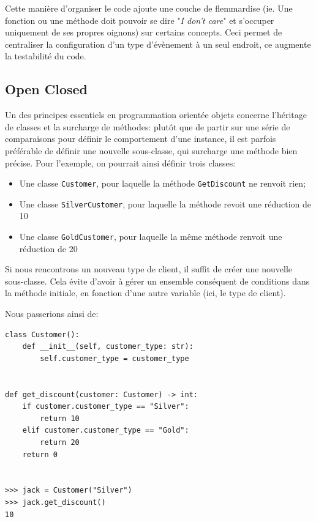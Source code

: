 \documentclass[11pt]{amsbook}
\begin{document}
Cette manière d’organiser le code ajoute une couche de flemmardise (ie. Une fonction ou une méthode doit pouvoir se dire "\emph{I don’t care}" et s’occuper uniquement de ses propres oignons) sur certains concepts. Ceci permet de centraliser la configuration d’un type d’évènement à un seul endroit, ce augmente la testabilité du code.


\hypertarget{x-open-closed}{\subsection{Open Closed}}
Un des principes essentiels en programmation orientée objets concerne l’héritage de classes et la surcharge de méthodes: plutôt que de partir sur une série de comparaisons pour définir le comportement d’une instance, il est parfois préférable de définir une nouvelle sous-classe, qui surcharge une méthode bien précise.
Pour l’exemple, on pourrait ainsi définir trois classes:


\begin{itemize}

\item Une classe \texttt{Customer}, pour laquelle la méthode \texttt{GetDiscount} ne renvoit rien;

\item Une classe \texttt{SilverCustomer}, pour laquelle la méthode revoit une réduction de 10%

\item Une classe \texttt{GoldCustomer}, pour laquelle la même méthode renvoit une réduction de 20%

\end{itemize}


Si nous rencontrons un nouveau type de client, il suffit de créer une nouvelle sous-classe.
Cela évite d’avoir à gérer un ensemble conséquent de conditions dans la méthode initiale, en fonction d’une autre variable (ici, le type de client).


Nous passerions ainsi de:


\begin{verbatim}
class Customer():
    def __init__(self, customer_type: str):
        self.customer_type = customer_type


def get_discount(customer: Customer) -> int:
    if customer.customer_type == "Silver":
        return 10
    elif customer.customer_type == "Gold":
        return 20
    return 0


>>> jack = Customer("Silver")
>>> jack.get_discount()
10
\end{verbatim}
\end{document}
